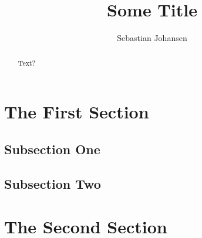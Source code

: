 \documentclass[preprint,12pt]{elsarticle}
\begin{document}
\begin{frontmatter}

\title{Some Title}

\author{Sebastian Johansen}

\address{Here}

\begin{abstract}
Text?
\end{abstract}

\end{frontmatter}

\section{The First Section}

\subsection{Subsection One}

\subsection{Subsection Two}

\section{The Second Section}
\end{document}
